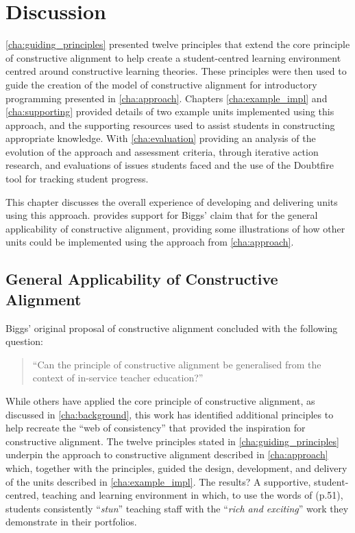 
\chapter{Discussion} %
\label{cha:discussion}

\graphicspath{{Figures/Discussion/}}

\cref{cha:guiding_principles} presented twelve principles that extend the core principle of constructive alignment to help create a student-centred learning environment centred around constructive learning theories. These principles were then used to guide the creation of the model of constructive alignment for introductory programming presented in \cref{cha:approach}. Chapters \ref{cha:example_impl} and \ref{cha:supporting} provided details of two example units implemented using this approach, and the supporting resources used to assist students in constructing appropriate knowledge. With \cref{cha:evaluation} providing an analysis of the evolution of the approach and assessment criteria, through iterative action research, and evaluations of issues students faced and the use of the Doubtfire tool for tracking student progress. 

This chapter discusses the overall experience of developing and delivering units using this approach.  provides support for Biggs' claim that for the general applicability of constructive alignment, providing some illustrations of how other units could be implemented using the approach from \cref{cha:approach}. 

\section{General Applicability of Constructive Alignment} %
\label{sec:general_applicability_of_constructive_alignment}

Biggs' original proposal of constructive alignment concluded with the following question:

\begin{quote}
	``Can the principle of constructive alignment be generalised from the context of in-service teacher education?'' \citet{Biggs:1996c}
\end{quote}

While others have applied the core principle of constructive alignment, as discussed in \cref{cha:background}, this work has identified additional principles to help recreate the ``web of consistency'' that provided the inspiration for \citet{Biggs:1996c,Biggs:1999} constructive alignment. The twelve principles stated in \cref{cha:guiding_principles} underpin the approach to constructive alignment described in \cref{cha:approach} which, together with the principles, guided the design, development, and delivery of the units described in \cref{cha:example_impl}. The results? A supportive, student-centred, teaching and learning environment in which, to use the words of \citet{Biggs:2007} (p.51), students consistently ``\emph{stun}'' teaching staff with the ``\emph{rich and exciting}'' work they demonstrate in their portfolios.

